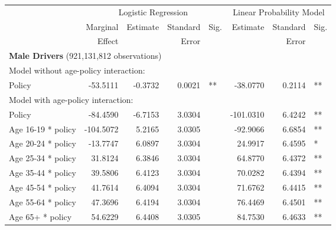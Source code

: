 
\begin{table}%
\centering 
\begin{tabular}{l r r r l r r l} 

\hline 
 
 & \multicolumn{4}{c}{Logistic Regression}  & \multicolumn{3}{c}{Linear Probability Model} \\ 

 \cmidrule(lr){2-5}\cmidrule(lr){6-8} 
 & Marginal & Estimate & Standard & Sig. & Estimate & Standard & Sig. \\ 
 &   Effect &          &  Error   &      &          &  Error   &     \\ 

\hline 
 
\multicolumn{7}{l}{\textbf{Male Drivers} (921,131,812 observations)} \\ 

\hline
\multicolumn{7}{l}{Model without age-policy interaction: } \\ 
Policy                   &  -53.5111       &  -0.3732        &  0.0021       &   **       &  -38.0770        &  0.2114       &   **       \\ 
\hline
\multicolumn{7}{l}{Model with age-policy interaction: } \\ 
Policy                   &  -84.4590       &  -6.7153        &  3.0304       &            &  -101.0310        &  6.4242       &   **       \\ 
Age 16-19 * policy   &  -104.5072       &  5.2165        &  3.0305       &            &  -92.9066        &  6.6854       &   **       \\ 
Age 20-24 * policy   &  -13.7747       &  6.0897        &  3.0304       &            &  24.9917        &  6.4595       &    *       \\ 
Age 25-34 * policy   &  31.8124       &  6.3846        &  3.0304       &            &  64.8770        &  6.4372       &   **       \\ 
Age 35-44 * policy   &  39.5806       &  6.4123        &  3.0304       &            &  70.0282        &  6.4394       &   **       \\ 
Age 45-54 * policy   &  41.7614       &  6.4094        &  3.0304       &            &  71.6762        &  6.4415       &   **       \\ 
Age 55-64 * policy   &  47.3696       &  6.4194        &  3.0304       &            &  76.4469        &  6.4501       &   **       \\ 
Age 65+ * policy   &  54.6229       &  6.4408        &  3.0305       &            &  84.7530        &  6.4633       &   **       \\ 


\end{tabular}
\end{table}
